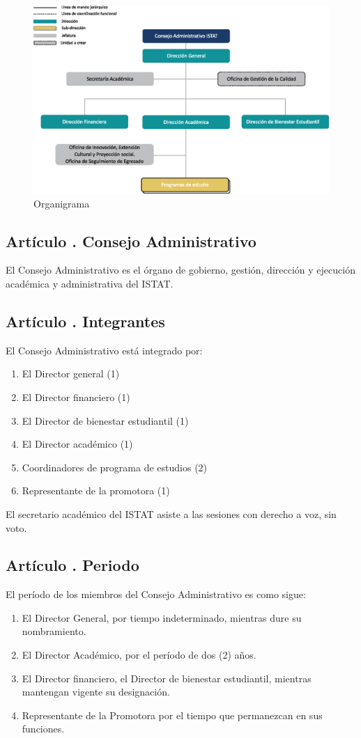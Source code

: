 \begin{figure}[h]
\centering
	\includegraphics[scale=0.7]{imagenes/organigrama-istat.eps}
	\caption{Organigrama}
	\label{fig:mesh1}
\end{figure}
\subsection{Artículo . Consejo Administrativo}
\addtocounter{ns}{1}
El Consejo Administrativo es el órgano de gobierno, gestión, dirección y ejecución académica y administrativa del ISTAT.
\subsection{Artículo . Integrantes}
\addtocounter{ns}{1}
El Consejo Administrativo está integrado por: 
\begin{enumerate}
\item El Director general (1) 
\item El Director financiero (1) 
\item El Director de bienestar estudiantil (1) 
\item El Director académico (1) 
\item Coordinadores de programa de estudios (2) 
\item Representante de la promotora (1)
\end{enumerate}
El secretario académico del ISTAT asiste a las sesiones con derecho a voz, sin voto.
\subsection{Artículo . Periodo}
\addtocounter{ns}{1}
El período de los miembros del Consejo Administrativo es como sigue: 
\begin{enumerate}
\item El Director General, por tiempo indeterminado, mientras dure su nombramiento.
\item El Director Académico, por el período de dos (2) años. 
\item El Director financiero, el Director de bienestar estudiantil, mientras mantengan vigente su designación. 
\item Representante de la Promotora por el tiempo que permanezcan en sus funciones. 
\end{enumerate}

